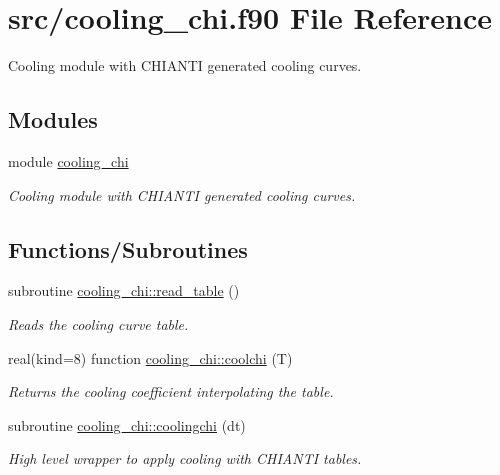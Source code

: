\hypertarget{cooling__chi_8f90}{}\section{src/cooling\+\_\+chi.f90 File Reference}
\label{cooling__chi_8f90}


Cooling module with C\+H\+I\+A\+N\+T\+I generated cooling curves.  


\subsection*{Modules}
\begin{DoxyCompactItemize}
\item 
module \hyperlink{namespacecooling__chi}{cooling\+\_\+chi}
\begin{DoxyCompactList}\small\item\em Cooling module with C\+H\+I\+A\+N\+T\+I generated cooling curves. \end{DoxyCompactList}\end{DoxyCompactItemize}
\subsection*{Functions/\+Subroutines}
\begin{DoxyCompactItemize}
\item 
subroutine \hyperlink{namespacecooling__chi_acdcfaea636dd68b666577d8daf434d35}{cooling\+\_\+chi\+::read\+\_\+table} ()
\begin{DoxyCompactList}\small\item\em Reads the cooling curve table. \end{DoxyCompactList}\item 
real(kind=8) function \hyperlink{namespacecooling__chi_a20c87eb43e4f324fa7d83fe9174fd767}{cooling\+\_\+chi\+::coolchi} (T)
\begin{DoxyCompactList}\small\item\em Returns the cooling coefficient interpolating the table. \end{DoxyCompactList}\item 
subroutine \hyperlink{namespacecooling__chi_a16ac452561e4a332a960a3ea7304f103}{cooling\+\_\+chi\+::coolingchi} (dt)
\begin{DoxyCompactList}\small\item\em High level wrapper to apply cooling with C\+H\+I\+A\+N\+T\+I tables. \end{DoxyCompactList}\end{DoxyCompactItemize}
